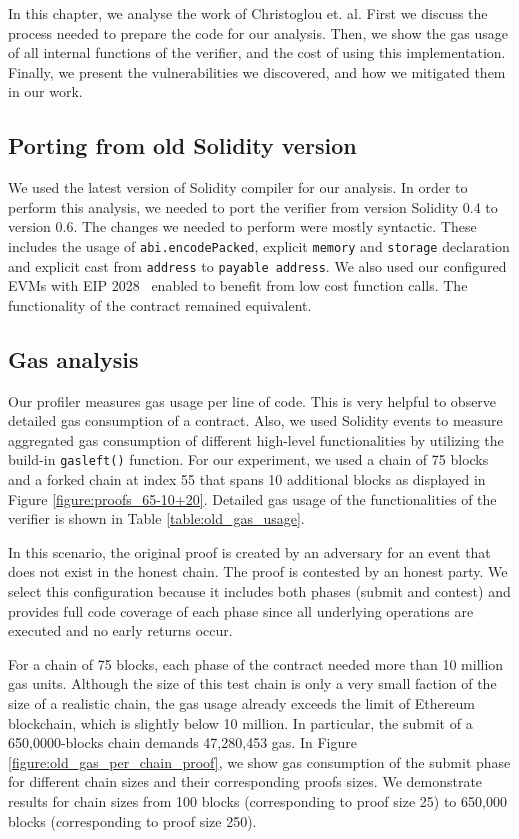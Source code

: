 In this chapter, we analyse the work of Christoglou et. al. First we
discuss the process needed to prepare the code for our analysis. Then, we show
the gas usage of all internal functions of the verifier, and the cost of using
this implementation. Finally, we present the vulnerabilities we discovered, and
how we mitigated them in our work.

\subsection{Porting from old Solidity version}

We used the latest version of Solidity compiler for our analysis. In order to
perform this analysis, we needed to port the verifier from version Solidity 0.4
to version 0.6. The changes we needed to perform were mostly syntactic. These
includes the usage of \texttt{abi.encodePacked}, explicit \texttt{memory} and
\texttt{storage} declaration and explicit cast from \texttt{address} to
\texttt{payable address}. We also used our configured EVMs with EIP
2028~\cite{EIP2028} enabled to benefit from low cost function calls. The
functionality of the contract remained equivalent.

\subsection{Gas analysis}

Our profiler measures gas usage per line of code. This is very helpful to
observe detailed gas consumption of a contract. Also, we used Solidity events
to measure aggregated gas consumption of different high-level functionalities
by utilizing the build-in \texttt{gasleft()} function. For our experiment, we
used a chain of 75 blocks and a forked chain at index 55 that spans 10
additional blocks as displayed in Figure \ref{figure:proofs_65-10+20}. Detailed
gas usage of the functionalities of the verifier is shown in Table
\ref{table:old_gas_usage}.




In this scenario, the original proof is created by an adversary for an event
that does not exist in the honest chain. The proof is contested by an honest
party. We select this configuration because it includes both phases
(submit and contest) and provides full code coverage of each phase since all
underlying operations are executed and no early returns occur.

For a chain of 75 blocks, each phase of the contract needed more than 10
million gas units. Although the size of this test chain is only a very small
faction of the size of a realistic chain, the gas usage already exceeds the
limit of Ethereum blockchain, which is slightly below 10 million. In
particular, the submit of a 650,0000-blocks chain demands 47,280,453 gas. In
Figure \ref{figure:old_gas_per_chain_proof}, we show gas consumption of the submit
phase for different chain sizes and their corresponding proofs sizes. We
demonstrate results for chain sizes from 100 blocks (corresponding to proof size
25) to 650,000 blocks (corresponding to proof size 250).

